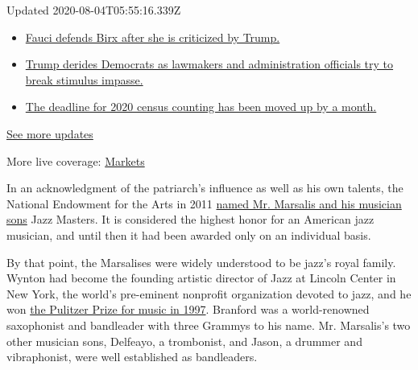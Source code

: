 Updated 2020-08-04T05:55:16.339Z

\begin{itemize}
\tightlist
\item
  \href{https://www.nytimes.com/2020/08/03/world/coronavirus-covid-19.html?action=click\&pgtype=Article\&state=default\&region=MAIN_CONTENT_1\&context=storylines_live_updates\#link-4547638f}{Fauci
  defends Birx after she is criticized by Trump.}
\item
  \href{https://www.nytimes.com/2020/08/03/world/coronavirus-covid-19.html?action=click\&pgtype=Article\&state=default\&region=MAIN_CONTENT_1\&context=storylines_live_updates\#link-15e7f995}{Trump
  derides Democrats as lawmakers and administration officials try to
  break stimulus impasse.}
\item
  \href{https://www.nytimes.com/2020/08/03/world/coronavirus-covid-19.html?action=click\&pgtype=Article\&state=default\&region=MAIN_CONTENT_1\&context=storylines_live_updates\#link-e5a2cda}{The
  deadline for 2020 census counting has been moved up by a month.}
\end{itemize}

\href{https://www.nytimes.com/2020/08/03/world/coronavirus-covid-19.html?action=click\&pgtype=Article\&state=default\&region=MAIN_CONTENT_1\&context=storylines_live_updates}{See
more updates}

More live coverage:
\href{https://www.nytimes.com/live/2020/08/03/business/stock-market-today-coronavirus?action=click\&pgtype=Article\&state=default\&region=MAIN_CONTENT_1\&context=storylines_live_updates}{Markets}

In an acknowledgment of the patriarch's influence as well as his own
talents, the National Endowment for the Arts in 2011
\href{https://www.nytimes.com/2011/01/13/arts/music/13nea.html}{named
Mr. Marsalis and his musician sons} Jazz Masters. It is considered the
highest honor for an American jazz musician, and until then it had been
awarded only on an individual basis.

By that point, the Marsalises were widely understood to be jazz's royal
family. Wynton had become the founding artistic director of Jazz at
Lincoln Center in New York, the world's pre-eminent nonprofit
organization devoted to jazz, and he won
\href{https://www.pulitzer.org/winners/wynton-marsalis}{the Pulitzer
Prize for music in 1997}. Branford was a world-renowned saxophonist and
bandleader with three Grammys to his name. Mr. Marsalis's two other
musician sons, Delfeayo, a trombonist, and Jason, a drummer and
vibraphonist, were well established as bandleaders.

